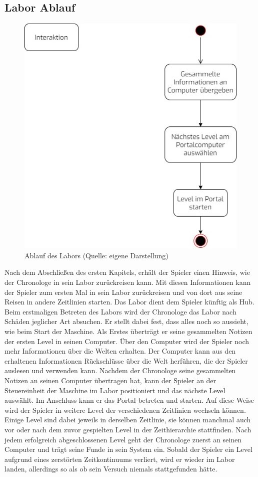 \subsection{Labor Ablauf}
\begin{figure}[ht]
\centering
\includegraphics[width=0.3\linewidth]{content/pictures/labor_loop.jpg}
\caption{Ablauf des Labors (Quelle: eigene Darstellung)}
\label{fig:labor_loop}
\end{figure}

Nach dem Abschließen des ersten Kapitels, erhält der Spieler einen Hinweis, wie der Chronologe in sein Labor zurückreisen kann. Mit diesen Informationen kann der Spieler zum ersten Mal in sein Labor zurückreisen und von dort aus seine Reisen in andere Zeitlinien starten. Das Labor dient dem Spieler künftig als Hub. Beim erstmaligen Betreten des Labors wird der Chronologe das Labor nach Schäden jeglicher Art absuchen. Er stellt dabei fest, dass alles noch so aussieht, wie beim Start der Maschine. Als Erstes überträgt er seine gesammelten Notizen der ersten Level in seinen Computer. Über den Computer wird der Spieler noch mehr Informationen über die Welten erhalten. Der Computer kann aus den erhaltenen Informationen Rückschlüsse über die Welt herführen, die der Spieler auslesen und verwenden kann. Nachdem der Chronologe seine gesammelten Notizen an seinen Computer übertragen hat, kann der Spieler an der Steuereinheit der Maschine im Labor positioniert und das nächste Level auswählt. Im Anschluss kann er das Portal betreten und starten. Auf diese Weise wird der Spieler in weitere Level der verschiedenen Zeitlinien wechseln können. Einige Level sind dabei jeweils in derselben Zeitlinie, sie können manchmal auch vor oder nach dem zuvor gespielten Level in der Zeithierarchie stattfinden. Nach jedem erfolgreich abgeschlossenen Level geht der Chronologe zuerst an seinen Computer und trägt seine Funde in sein System ein. Sobald der Spieler ein Level aufgrund eines zerstörten Zeitkontinuums verliert, wird er wieder im Labor landen, allerdings so als ob sein Versuch niemals stattgefunden hätte.

